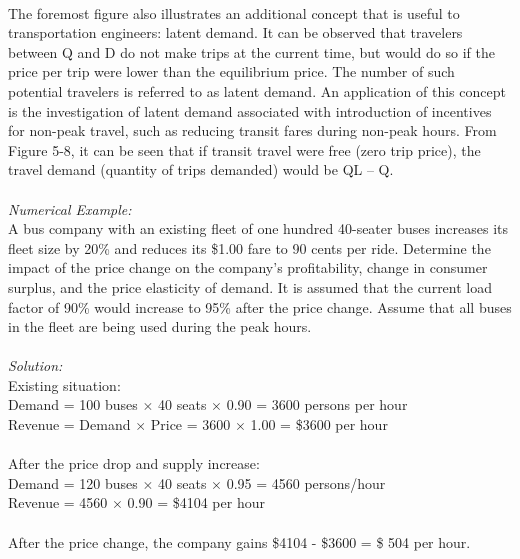 \paragraph{}
The foremost figure also illustrates an additional concept that is useful to transportation engineers: latent demand. It can be observed that travelers between Q and D do not make trips at the current time, but would do so if the price per trip were lower than the equilibrium price. The number of such potential travelers is referred to as latent demand. An application of this concept is the investigation of latent demand associated with introduction of incentives for non-peak travel, such as reducing transit fares during non-peak hours. From Figure 5-8, it can be seen that if transit travel were free (zero trip price), the travel demand (quantity of trips demanded) would be QL – Q.\\\\
\textit{Numerical Example:}\\
A bus company with an existing fleet of one hundred 40-seater buses increases its fleet size by 20\% and reduces its \$1.00 fare to 90 cents per ride. Determine the impact of the price change on the company’s profitability, change in consumer surplus, and the price elasticity of demand. It is assumed that the current load factor of 90\% would increase to 95\% after the price change. Assume that all buses in the fleet are being used during the peak hours.\\\\
\textit{Solution:}\\
Existing situation:\\
\hspace*{10mm}Demand = 100 buses $ \times $ 40 seats $ \times $ 0.90 = 3600 persons per hour\\
\hspace*{10mm}Revenue = Demand $ \times $ Price = 3600 $ \times $ 1.00 = \$3600 per hour\\\\
After the price drop and supply increase:\\
\hspace*{10mm}Demand = 120 buses $ \times $ 40 seats $ \times $ 0.95 = 4560 persons/hour\\
\hspace*{10mm}Revenue = 4560 $ \times $ 0.90 = \$4104 per hour\\\\
After the price change, the company gains \$4104 - \$3600 = \$ 504 per hour.\\\\
